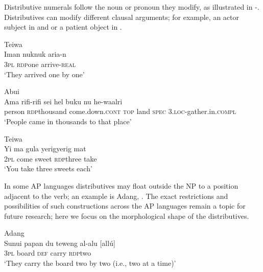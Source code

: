 Distributive numerals follow the noun or pronoun they modify, as illustrated in -. Distributives can modify different clausal arguments; for example, an actor subject in  and  or a patient object in .


\ea%
\label{bkm:Ref342655549}
{\upshape Teiwa}\\
\gll Iman  nuk\textit{{\Tilde}}nuk  aria-n\\  
    \textsc{3pl}   \textsc{rdp}\textit{{\Tilde}}one   arrive-\textsc{real}\\
\glt `They arrived one by one' 
\z

    

   


\ea%
\label{bkm:Ref342738939}
{\upshape Abui}\\
\gll  Ama    rifi-rifi    sei        hel  buku  nu  he-waalri \\  
    person    \textsc{rdp{\Tilde}}thousand   come.down.\textsc{cont}    \textsc{top  } land  \textsc{spec}   3.\textsc{loc-}gather.in.\textsc{compl}  \\
\glt `People came in thousands to that place' 
\z

    
 

   

   

\ea%
\label{bkm:Ref342655553}
{\upshape Teiwa}\\
\gll Yi   ma   gula   yerig{\Tilde}yerig   mat\\  
     2\textsc{pl } come  sweet  \textsc{rdp}\textit{{\Tilde}}three  take \\
\glt `You take three sweets each'
\z

   

  

   

In some AP languages distributives may float outside the NP to a position adjacent to the verb; an example is Adang, . The exact restrictions and possibilities of such constructions across the AP languages remain a topic for future research; here we focus on the morphological shape of the distributives.


\ea
\label{ex:8:1235}
{\upshape Adang}\\
 \gll  Sunui{\textltailn}   papan   du   teweng al-alu  [all\'u]\\
   3\textsc{pl}    board  \textsc{def}   carry   \textsc{rdp}\textit{{\Tilde}}two \\
 \glt `They carry the board two by two (i.e., two at a time)'
\z

